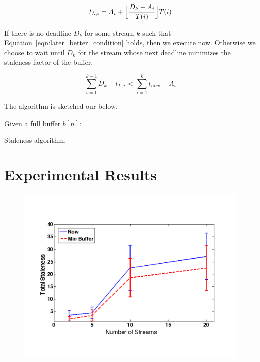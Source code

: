 \begin{equation}
t_{L,i} = A_{i} + \Bigl\lfloor \frac{D_{k}-A_{i}}{T(i)} \Bigr\rfloor T(i)
\label{eqn:last_deadline}
\end{equation}

If there is no deadline $D_{k}$ for some stream $k$ such that Equation~\ref{eqn:later_better_condition} holds, then we execute now.  Otherwise we choose to wait
until $D_{k}$ for the stream whose next deadline minimizes the staleness factor of the buffer.


\begin{equation}
\sum_{i=1}^{k-1} D_{k} - t_{L,i} < \sum_{i=1}^{k} t_{now} - A_{i}
\label{eqn:later_better_condition}
\end{equation}

The algorithm is sketched our below.


\begin{algorithm}[h!]
 \SetAlgoLined
 Given a full buffer $b[n]$:\\
 \caption{Staleness algorithm.}
 \label{alg:emd}
\end{algorithm}

\section{Experimental Results}

\begin{figure}[t!] %
\centering
\includegraphics[width=0.9\columnwidth]{figs/staleness_vs_numstreams}
\caption{}
\label{fig:stalevsstreams}
\end{figure}

